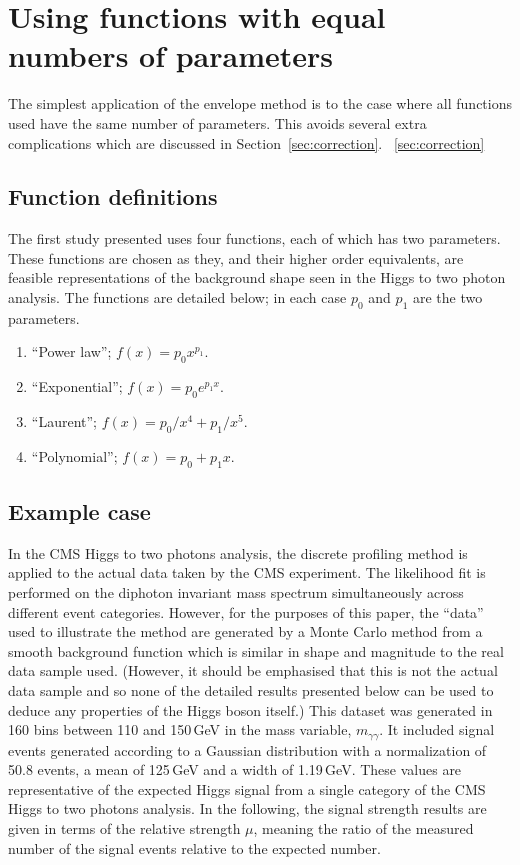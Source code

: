 \section{Using functions with equal numbers of parameters} %
\label{sec:functions}

The simplest application of the envelope method is to the case where all
functions used have the same number of parameters. This avoids several extra
complications which are discussed in Section~\ref{sec:correction}.
~\ref{sec:correction}
\subsection{Function definitions}
\label{sec:functions:function}

The first study presented uses four functions, each of which has two parameters.
These functions are chosen as they, and their higher order equivalents,
are feasible representations of the background shape seen in the Higgs to two photon
analysis. The functions are detailed below; in each case $p_0$ and $p_1$ are
the two parameters.
\begin{enumerate}
\item
``Power law''; $f(x) = p_0 x^{p_1}$.
\item
``Exponential''; $f(x) = p_0 e^{p_1x}$.
\item
``Laurent''; $f(x) = p_0/x^4 + p_1/x^5$.
\item
``Polynomial''; $f(x) = p_0 + p_1 x$.
\end{enumerate}

\subsection{Example case}
\label{sec:functions:example}

In the CMS Higgs to two photons analysis, the discrete profiling method is applied to
the actual data taken by the CMS experiment. The likelihood fit
is performed on the diphoton invariant mass spectrum simultaneously
across different event categories.
However, for the purposes of this
paper, the ``data'' used to illustrate the method are generated by a Monte Carlo
method from a smooth background
function which is similar in shape and magnitude to the
real data sample used. (However, it should be emphasised that this is not the
actual data sample and so
none of the detailed results presented below can be used to deduce any
properties of the Higgs boson itself.)
This dataset was generated in 160 bins between 110 and 150\,GeV in
the mass variable, $m_{\gamma\gamma}$.
It included signal events
generated according to a Gaussian distribution with a normalization of 50.8 events, a mean of 125\,GeV and a
width of 1.19\,GeV. These values are representative of the expected Higgs signal from a single category of the
CMS Higgs to two photons analysis.
In the following, the signal strength results are given in
terms of the relative strength $\mu$,
meaning the ratio of the measured number of the signal events relative
to the expected number.

